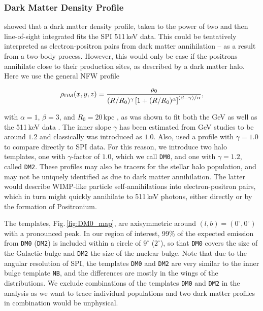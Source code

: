 \documentclass[doublespace,nopageskip]{VTthesis} %
\newcommand{\mrm}[1]{\mathrm{#1}}
\begin{document}
\subsubsection{Dark Matter Density Profile}

\citet{Skinner2014_511} showed that a dark matter density profile, taken to the power of two and then line-of-sight integrated fits the SPI 511\,keV data.
%
This could be tentatively interpreted as electron-positron pairs from dark matter annihilation -- as a result from a two-body process.
%
However, this would only be case if the positrons annihilate close to their production sites, as described by a dark matter halo.
%
Here we use the general NFW profile \citep{Navarro1997_NFW}

\begin{equation}
	\rho_{\rm DM}(x,y,z) = \frac{\rho_0}{(R/R_0)^{\gamma}\left[1+(R/R_0)^{\alpha}\right]^{(\beta-\gamma)/\alpha}}\mrm{,}
	\label{eq:NFW_profile}
\end{equation}

\noindent with $\alpha=1$, $\beta=3$, and $R_0=20\,\mrm{kpc}$ \citep{Abazajian2014_DMGeV}, as was shown to fit both the GeV \citep{Hooper2011_DMGeV,Abazajian2014_DMGeV,Daylan2016_GeVDM} as well as the 511\,keV data \citep{Vincent2012_dm511,Skinner2014_511}.
%
The inner slope $\gamma$ has been estimated from GeV studies to be around $1.2$ and classically was introduced as $1.0$.
%
Also, \citet{Skinner2014_511} used a profile with $\gamma=1.0$ to compare directly to SPI data.
%
For this reason, we introduce two halo templates, one with $\gamma$-factor of $1.0$, which we call \texttt{DM0}, and one with $\gamma=1.2$, called \texttt{DM2}.
%
These profiles may also be tracers for the stellar halo population, and may not be uniquely identified as due to dark matter annihilation.
%
The latter would describe WIMP-like particle self-annihilations into electron-positron pairs, which in turn might quickly annihilate to 511\,keV photons, either directly or by the formation of Positronium.

The templates, Fig.\,\ref{fig:DM0_map}, are axisymmetric around $(l,b)=(0^{\circ},0^{\circ})$ with a pronounced peak.
%
In our region of interest, 99\% of the expected emission from \texttt{DM0} (\texttt{DM2}) is included within a circle of $9^{\circ}$ ($2^{\circ}$), so that \texttt{DM0} covers the size of the Galactic bulge and \texttt{DM2} the size of the nuclear bulge.
%
Note that due to the angular resolution of SPI, the templates \texttt{DM0} and \texttt{DM2} are very similar to the inner bulge template \texttt{NB}, and the differences are mostly in the wings of the distributions.
%
We exclude combinations of the templates \texttt{DM0} and \texttt{DM2} in the analysis as we want to trace individual populations and two dark matter profiles in combination would be unphysical.
\end{document}
